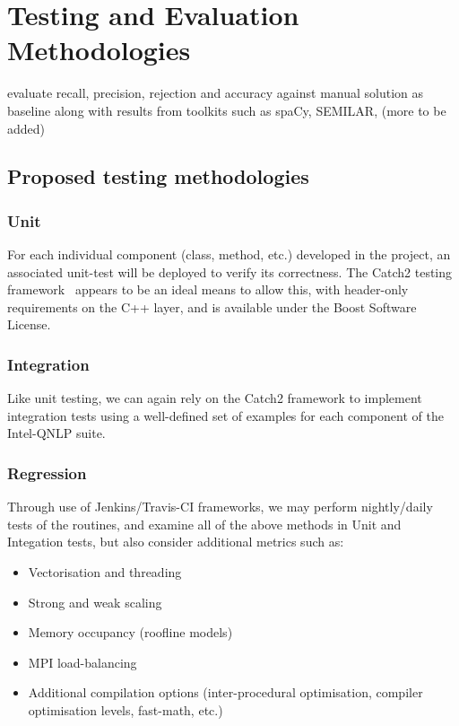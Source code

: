 \section{Testing and Evaluation Methodologies}
\label{sec:testing_and_evaluation_methodologies}

evaluate recall, precision, rejection and accuracy against manual solution as baseline along with results from toolkits such as spaCy, SEMILAR, (more to be added)


\subsection{Proposed testing methodologies}
\subsubsection*{Unit}
For each individual component (class, method, etc.) developed in the project, an associated unit-test will be deployed to verify its correctness. The Catch2 testing framework~\cite{catch2} appears to be an ideal means to allow this, with header-only requirements on the C++ layer, and is available under the Boost Software License.

\subsubsection*{Integration}
Like unit testing, we can again rely on the Catch2 framework to implement integration tests using a well-defined set of examples for each component of the Intel-QNLP suite.

\subsubsection*{Regression}
Through use of Jenkins/Travis-CI frameworks, we may perform nightly/daily tests of the routines, and examine all of the above methods in Unit and Integation tests, but also consider additional metrics such as:
\begin{itemize}
    \item Vectorisation and threading
    \item Strong and weak scaling
    \item Memory occupancy (roofline models)
    \item MPI load-balancing
    \item Additional compilation options (inter-procedural optimisation, compiler optimisation levels, fast-math, etc.) 
\end{itemize}


